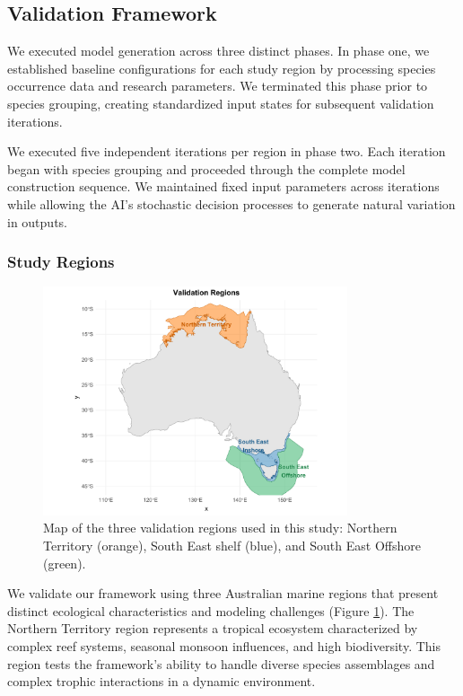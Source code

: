 \subsection{Validation Framework}

We executed model generation across three distinct phases. In phase one, we established baseline configurations for each study region by processing species occurrence data and research parameters. We terminated this phase prior to species grouping, creating standardized input states for subsequent validation iterations.

We executed five independent iterations per region in phase two. Each iteration began with species grouping and proceeded through the complete model construction sequence. We maintained fixed input parameters across iterations while allowing the AI's stochastic decision processes to generate natural variation in outputs.

\subsubsection{Study Regions}

\begin{figure}[htbp]
    \centering
    \includegraphics[width=0.8\textwidth]{figures/validation_regions.pdf}
    \caption{Map of the three validation regions used in this study: Northern Territory (orange), South East shelf (blue), and South East Offshore (green).}
    \label{fig:validation_regions}
    \end{figure}

We validate our framework using three Australian marine regions that present distinct ecological characteristics and modeling challenges (Figure \ref{fig:validation_regions}). The Northern Territory region represents a tropical ecosystem characterized by complex reef systems, seasonal monsoon influences, and high biodiversity. This region tests the framework's ability to handle diverse species assemblages and complex trophic interactions in a dynamic environment.

